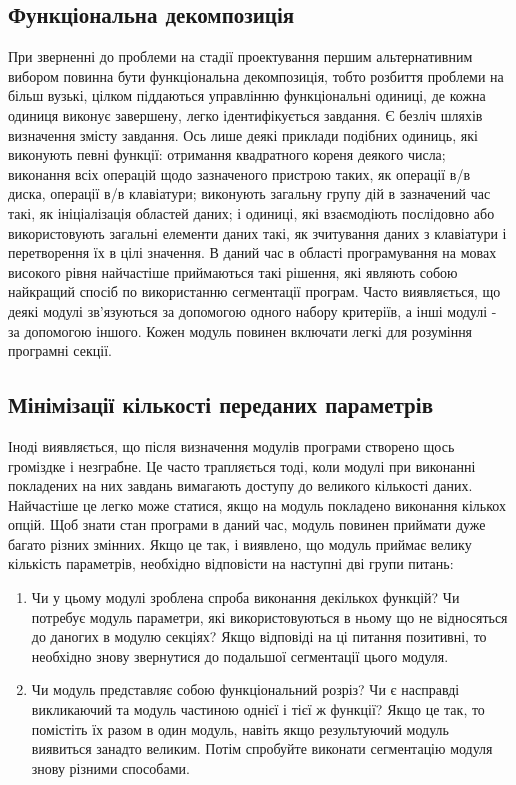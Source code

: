 \documentclass[a4paper,14pt, titlepage]{article}
\begin{document}
\subsection{Функціональна декомпозиція}

При зверненні до проблеми на стадії проектування першим альтернативним
вибором повинна бути функціональна декомпозиція, тобто розбиття проблеми
на більш вузькі, цілком піддаються управлінню функціональні одиниці, де
кожна одиниця виконує завершену, легко ідентифікується завдання. Є
безліч шляхів визначення змісту завдання. Ось лише деякі приклади
подібних одиниць, які виконують певні функції: отримання квадратного
кореня деякого числа; виконання всіх операцій щодо зазначеного пристрою
таких, як операції в/в диска, операції в/в клавіатури; виконують
загальну групу дій в зазначений час такі, як ініціалізація областей
даних; і одиниці, які взаємодіють послідовно або використовують загальні
елементи даних такі, як зчитування даних з клавіатури і перетворення їх
в цілі значення. В даний час в області програмування на мовах високого
рівня найчастіше приймаються такі рішення, які являють собою найкращий
спосіб по використанню сегментації програм. Часто виявляється, що деякі
модулі зв'язуються за допомогою одного набору критеріїв, а інші модулі -
за допомогою іншого. Кожен модуль повинен включати легкі для розуміння
програмні секції.


\subsection{Мінімізації кількості переданих параметрів}

Іноді виявляється, що після визначення модулів програми створено щось
громіздке і незграбне. Це часто трапляється тоді, коли модулі при
виконанні покладених на них завдань вимагають доступу до великого
кількості даних. Найчастіше це легко може статися, якщо на модуль
покладено виконання кількох опцій. Щоб знати стан програми в даний час,
модуль повинен приймати дуже багато різних змінних. Якщо це так, і
виявлено, що модуль приймає велику кількість параметрів, необхідно
відповісти на наступні дві групи питань:
\begin{enumerate}
    \item Чи у цьому модулі зроблена
    спроба виконання декількох функцій? Чи потребує модуль параметри, які
    використовуються в ньому що не відносяться до даногих в модулю секціях? Якщо
    відповіді на ці питання позитивні, то необхідно знову звернутися до
    подальшої сегментації цього модуля.
    \item Чи модуль представляє собою
    функціональний розріз? Чи є насправді викликаючий та модуль частиною
    однієї і тієї ж функції? Якщо це так, то помістіть їх разом в один
    модуль, навіть якщо результуючий модуль виявиться занадто великим. Потім
    спробуйте виконати сегментацію модуля знову різними способами.
\end{enumerate}
\end{document}
